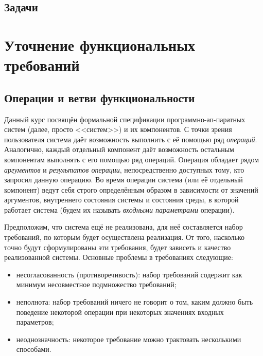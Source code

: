 \documentclass[14pt, twoside]{extreport}
\begin{document}
    

    \section*{Задачи}

    

    




\chapter{Уточнение функциональных требований}

\section{Операции и ветви функциональности}

Данный курс посвящён формальной спецификации программно-ап-паратных систем (далее, просто <<систем>>) и их компонентов. С точки зрения пользователя система даёт возможность выполнить с её помощью ряд \emph{операций}. Аналогично, каждый отдельный компонент даёт возможность остальным компонентам выполнять с его помощью ряд операций. Операция обладает рядом \emph{аргументов} и \emph{результатов операции}, непосредственно доступных тому, кто запросил данную операцию. Во время операции система (или её отдельный компонент) ведут себя строго определённым образом в зависимости от значений аргументов, внутреннего состояния системы и состояния среды, в которой работает система (будем их называть \emph{входными параметрами} операции).

Предположим, что система ещё не реализована, для неё составляется набор требований, по которым будет осуществлена реализация. От того, насколько точно будут сформулированы эти требования, будет зависеть и качество реализованной системы. Основные проблемы в требованиях следующие:
\begin{itemize}
  \item несогласованность (противоречивость): набор требований содержит как минимум несовместное подмножество требований;
  \item неполнота: набор требований ничего не говорит о том, каким должно быть поведение некоторой операции при некоторых значениях входных параметров;
  \item неоднозначность: некоторое требование можно трактовать несколькими способами.
\end{itemize}
\end{document}
